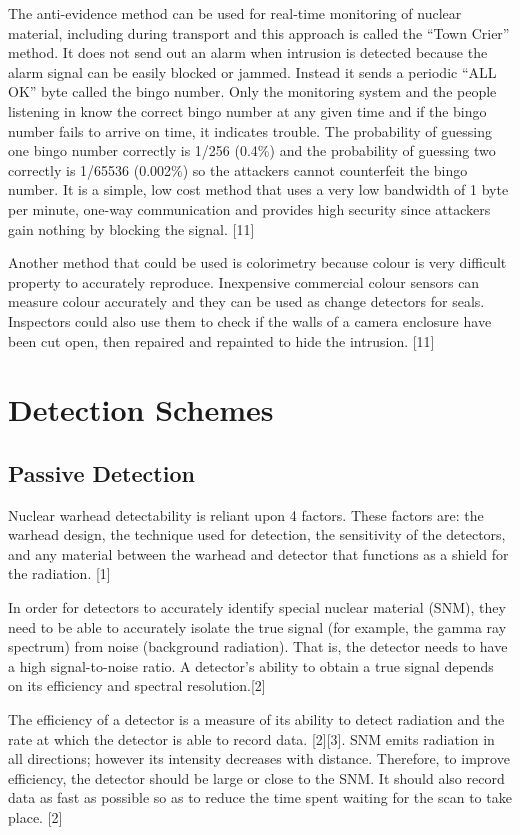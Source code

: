\documentclass[twocolumn,a4paper]{article}
\begin{document}
The anti-evidence method can be used for real-time monitoring of
nuclear material, including during transport and this approach is
called the ``Town Crier'' method. It does not send out an alarm when
intrusion is detected because the alarm signal can be easily blocked
or jammed. Instead it sends a periodic ``ALL OK'' byte called the
bingo number. Only the monitoring system and the people listening in
know the correct bingo number at any given time and if the bingo
number fails to arrive on time, it indicates trouble. The probability
of guessing one bingo number correctly is 1/256 (0.4\%) and the
probability of guessing two correctly is 1/65536 (0.002\%) so the
attackers cannot counterfeit the bingo number. It is a simple, low
cost method that uses a very low bandwidth of 1 byte per minute,
one-way communication and provides high security since attackers gain
nothing by blocking the signal. [11]

Another method that could be used is colorimetry because colour is very
difficult property to accurately reproduce. Inexpensive commercial
colour sensors can measure colour accurately and they can be used as
change detectors for seals. Inspectors could also use them to check if
the walls of a camera enclosure have been cut open, then repaired and
repainted to hide the intrusion. [11]

\section{Detection Schemes}
\subsection{Passive Detection}

Nuclear warhead detectability is reliant upon 4 factors. These factors
are: the warhead design, the technique used for detection, the
sensitivity of the detectors, and any material between the warhead and
detector that functions as a shield for the radiation. [1]

In order for detectors to accurately identify special nuclear material
(SNM), they need to be able to accurately isolate the true signal (for
example, the gamma ray spectrum) from noise (background
radiation). That is, the detector needs to have a high signal-to-noise
ratio. A detector’s ability to obtain a true signal depends on its
efficiency and spectral resolution.[2]

The efficiency of a detector is a measure of its ability to detect
radiation and the rate at which the detector is able to record
data. [2][3]. SNM emits radiation in all directions; however its
intensity decreases with distance. Therefore, to improve efficiency,
the detector should be large or close to the SNM. It should also
record data as fast as possible so as to reduce the time spent waiting
for the scan to take place. [2]
\end{document}
